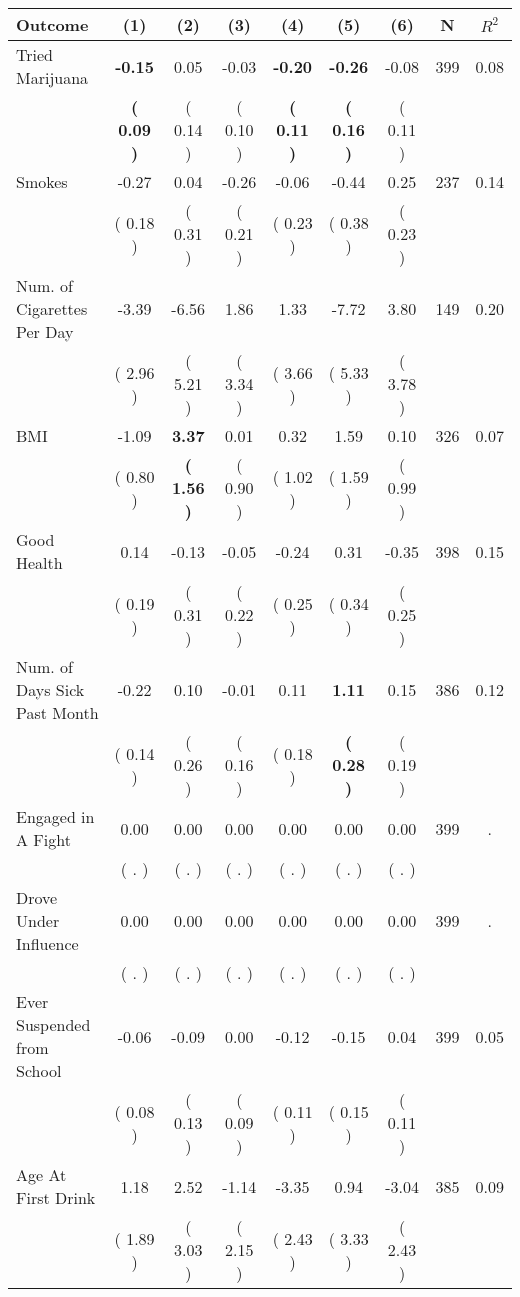 \begin{tabular}{lcccccccc}
\toprule
 \textbf{Outcome} & \textbf{(1)} & \textbf{(2)} & \textbf{(3)} & \textbf{(4)} & \textbf{(5)} & \textbf{(6)} & \textbf{N} & \textbf{$ R^2$} \\
\midrule
Tried Marijuana & \textbf{    -0.15} &      0.05 &     -0.03 & \textbf{    -0.20} & \textbf{    -0.26} &     -0.08 & 399 &       0.08 \\ 
 & \textbf{(     0.09 )} & (     0.14 ) & (     0.10 ) & \textbf{(     0.11 )} & \textbf{(     0.16 )} & (     0.11 ) & \\
Smokes &     -0.27 &      0.04 &     -0.26 &     -0.06 &     -0.44 &      0.25 & 237 &       0.14 \\ 
 & (     0.18 ) & (     0.31 ) & (     0.21 ) & (     0.23 ) & (     0.38 ) & (     0.23 ) & \\
Num. of Cigarettes Per Day &     -3.39 &     -6.56 &      1.86 &      1.33 &     -7.72 &      3.80 & 149 &       0.20 \\ 
 & (     2.96 ) & (     5.21 ) & (     3.34 ) & (     3.66 ) & (     5.33 ) & (     3.78 ) & \\
BMI &     -1.09 & \textbf{     3.37} &      0.01 &      0.32 &      1.59 &      0.10 & 326 &       0.07 \\ 
 & (     0.80 ) & \textbf{(     1.56 )} & (     0.90 ) & (     1.02 ) & (     1.59 ) & (     0.99 ) & \\
Good Health &      0.14 &     -0.13 &     -0.05 &     -0.24 &      0.31 &     -0.35 & 398 &       0.15 \\ 
 & (     0.19 ) & (     0.31 ) & (     0.22 ) & (     0.25 ) & (     0.34 ) & (     0.25 ) & \\
Num. of Days Sick Past Month &     -0.22 &      0.10 &     -0.01 &      0.11 & \textbf{     1.11} &      0.15 & 386 &       0.12 \\ 
 & (     0.14 ) & (     0.26 ) & (     0.16 ) & (     0.18 ) & \textbf{(     0.28 )} & (     0.19 ) & \\
Engaged in A Fight &      0.00 &      0.00 &      0.00 &      0.00 &      0.00 &      0.00 & 399 &          . \\ 
 & (        . ) & (        . ) & (        . ) & (        . ) & (        . ) & (        . ) & \\
Drove Under Influence &      0.00 &      0.00 &      0.00 &      0.00 &      0.00 &      0.00 & 399 &          . \\ 
 & (        . ) & (        . ) & (        . ) & (        . ) & (        . ) & (        . ) & \\
Ever Suspended from School &     -0.06 &     -0.09 &      0.00 &     -0.12 &     -0.15 &      0.04 & 399 &       0.05 \\ 
 & (     0.08 ) & (     0.13 ) & (     0.09 ) & (     0.11 ) & (     0.15 ) & (     0.11 ) & \\
Age At First Drink &      1.18 &      2.52 &     -1.14 &     -3.35 &      0.94 &     -3.04 & 385 &       0.09 \\ 
 & (     1.89 ) & (     3.03 ) & (     2.15 ) & (     2.43 ) & (     3.33 ) & (     2.43 ) & \\
\bottomrule
\end{tabular}
